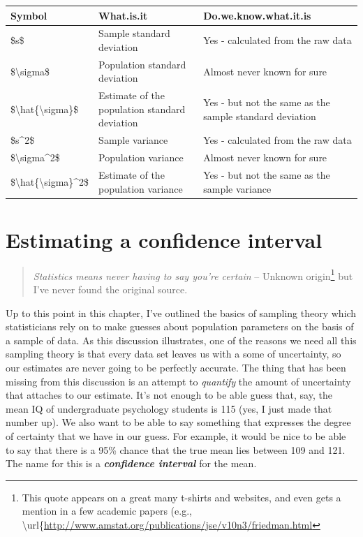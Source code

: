 \documentclass[spanish,]{book}
\let\rmarkdownfootnote\footnote%
\def\footnote{\protect\rmarkdownfootnote}
\begin{document}
\begin{tabular}{l|l|l}
\hline
Symbol & What.is.it & Do.we.know.what.it.is\\
\hline
\$s\$ & Sample standard deviation & Yes - calculated from the raw data\\
\hline
\$\textbackslash{}sigma\$ & Population standard deviation & Almost never known for sure\\
\hline
\$\textbackslash{}hat\{\textbackslash{}sigma\}\$ & Estimate of the population standard deviation & Yes - but not the same as the sample standard deviation\\
\hline
\$s\textasciicircum{}2\$ & Sample variance & Yes - calculated from the raw data\\
\hline
\$\textbackslash{}sigma\textasciicircum{}2\$ & Population variance & Almost never known for sure\\
\hline
\$\textbackslash{}hat\{\textbackslash{}sigma\}\textasciicircum{}2\$ & Estimate of the population variance & Yes -  but not the same as the sample variance\\
\hline
\end{tabular}

\section{Estimating a confidence interval}\label{ci}

\begin{quote}
\emph{Statistics means never having to say you're certain} -- Unknown
origin\footnote{This quote appears on a great many t-shirts and
  websites, and even gets a mention in a few academic papers (e.g.,
  \textbackslash{}url\{\url{http://www.amstat.org/publications/jse/v10n3/friedman.html}}
but I've never found the original source.
\end{quote}

Up to this point in this chapter, I've outlined the basics of sampling
theory which statisticians rely on to make guesses about population
parameters on the basis of a sample of data. As this discussion
illustrates, one of the reasons we need all this sampling theory is that
every data set leaves us with a some of uncertainty, so our estimates
are never going to be perfectly accurate. The thing that has been
missing from this discussion is an attempt to \emph{quantify} the amount
of uncertainty that attaches to our estimate. It's not enough to be able
guess that, say, the mean IQ of undergraduate psychology students is 115
(yes, I just made that number up). We also want to be able to say
something that expresses the degree of certainty that we have in our
guess. For example, it would be nice to be able to say that there is a
95\% chance that the true mean lies between 109 and 121. The name for
this is a \textbf{\emph{confidence interval}} for the mean.
\end{document}
